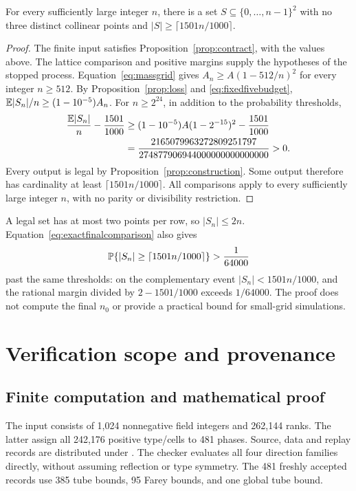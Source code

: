 \begin{corollary}\label{cor:target}
For every sufficiently large integer \(n\), there is a set
\(S\subseteq\{0,\ldots,n-1\}^2\) with no three distinct collinear
points and \(|S|\ge\lceil1501n/1000\rceil\).
\end{corollary}
\begin{proof}
The finite input satisfies Proposition~\ref{prop:contract}, with the
values above. The lattice comparison and positive margins supply
the hypotheses of the stopped process. Equation~\eqref{eq:massgrid}
gives \(A_n\ge A(1-512/n)^2\) for every integer \(n\ge512\).
By Proposition~\ref{prop:loss} and \eqref{eq:fixedfivebudget},
\(\mathbb E|S_n|/n\ge(1-10^{-5})A_n\). For \(n\ge2^{24}\), in
addition to the probability thresholds,
\begin{align}
 \frac{\mathbb E|S_n|}{n}-\frac{1501}{1000}
 &\ge(1-10^{-5})A(1-2^{-15})^2-\frac{1501}{1000}\notag\\
 &=\frac{2165079963272809251797}
 {274877906944000000000000000}>0.
 \label{eq:exactfinalcomparison}
\end{align}
Every output is legal by Proposition~\ref{prop:construction}.
Some output therefore has cardinality at least \(\lceil1501n/1000\rceil\).
All comparisons apply to every sufficiently large integer \(n\),
with no parity or divisibility restriction.
\end{proof}

A legal set has at most two points per row, so \(|S_n|\le2n\).
Equation~\eqref{eq:exactfinalcomparison} also gives
\[
 \mathbb P\{|S_n|\ge\lceil1501n/1000\rceil\}>\frac1{64000}
\]
past the same thresholds: on the complementary event \(|S_n|<1501n/1000\),
and the rational margin divided by \(2-1501/1000\) exceeds \(1/64000\).
The proof does not compute the final \(n_0\) or provide a practical
bound for small-grid simulations.

\section{Verification scope and provenance}\label{sec:status}

\subsection{Finite computation and mathematical proof}
The input consists of 1,024 nonnegative field integers and 262,144 ranks.
The latter assign all 242,176 positive type/cells to 481 phases.
Source, data and replay records are distributed under .
The checker evaluates all four direction families directly, without
assuming reflection or type symmetry. The 481 freshly accepted records
use 385 tube bounds, 95 Farey bounds, and one global tube bound.

